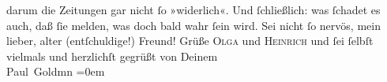\begin{ledgroupsized}[t]{13cm}
               darum die Zeitungen gar nicht ſo »widerlich«. Und ſchließlich: was ſchadet es auch,
               daß ſie melden, was doch bald wahr ſein wird. Sei nicht ſo nervös, mein lieber, alter
               (entſchuldige!) Freund!\pend
           \pstart
           Grüße \textsc{Olga} und \textsc{Heinrich} und ſei ſelbſt vielmals und herzlichſt gegrüßt von Deinem {\\[\baselineskip]}\spacefill\mbox{Paul Goldmn}\pend
           \leftskip=0em{}
         
         \endnumbering{}\end{ledgroupsized}  \newcommand{\dateiname}{L03378}\newcommand{\titel}{Paul Goldmann an Arthur Schnitzler, 23. 7. [1903]}\newcommand{\editorInnen}{Martin Anton Müller und Laura Untner}
      